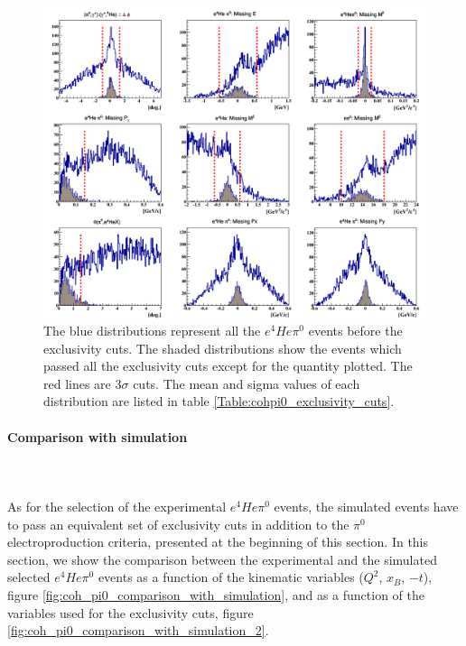 \begin{figure}[h!]
\centering
\includegraphics[scale=0.4]{fig_dvcs/all_coh_pi0_exc_cuts.png}
\caption{The blue distributions represent all the  $e^{4}He\pi^{0}$ events before the exclusivity cuts. The shaded distributions show the events which passed all the exclusivity cuts except for the quantity plotted. The red lines are $3\sigma$ cuts. The mean and sigma values of each distribution are listed in table \ref{Table:cohpi0_exclusivity_cuts}.} 
\label{fig:cohpi0_exclusivty_cuts}
\end{figure}

\paragraph{Comparison with simulation}
~\\
~\\As for the selection of the experimental $e^{4}He\pi^{0}$ events, the simulated events have to pass an equivalent set of exclusivity cuts in addition to the $\pi^{0}$ electroproduction criteria, presented at the beginning of this section. In this section, we show the comparison between the experimental and the simulated selected  $e^{4}He\pi^{0}$ events as a function of the kinematic variables ($Q^{2}$, $x_{B}$, $-t$), figure \ref{fig:coh_pi0_comparison_with_simulation}, and as a function of the variables used for the exclusivity cuts, figure \ref{fig:coh_pi0_comparison_with_simulation_2}.\\

